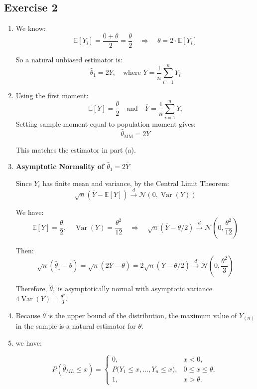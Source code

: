 \documentclass[12pt]{article}
\begin{document}
\begin{flushleft}
\section*{Exercise 2}

\begin{enumerate}[label=(\alph*)]

\item 

We know:
\[
\mathbb{E}[Y_i] = \frac{0 + \theta}{2} = \frac{\theta}{2}
\quad \Rightarrow \quad
\theta = 2 \cdot \mathbb{E}[Y_i]
\]

So a natural unbiased estimator is:
\[
\hat{\theta}_1 = 2 \overline{Y}, \quad \text{where } \overline{Y} = \frac{1}{n} \sum_{i=1}^n Y_i
\]

\item 

Using the first moment:
\[
\mathbb{E}[Y] = \frac{\theta}{2} \quad \text{and} \quad \overline{Y} = \frac{1}{n} \sum_{i=1}^n Y_i
\]
Setting sample moment equal to population moment gives:
\[
\hat{\theta}_{\text{MM}} = 2 \overline{Y}
\]

This matches the estimator in part (a).

\item \textbf{Asymptotic Normality of \( \hat{\theta}_1 = 2\overline{Y} \)}

Since \( Y_i \) has finite mean and variance, by the Central Limit Theorem:
\[
\sqrt{n}(\overline{Y} - \mathbb{E}[Y]) \xrightarrow{d} \mathcal{N}\left(0, \operatorname{Var}(Y)\right)
\]

We have:
\[
\mathbb{E}[Y] = \frac{\theta}{2}, \quad \operatorname{Var}(Y) = \frac{\theta^2}{12}
\quad \Rightarrow \quad
\sqrt{n}(\overline{Y} - \theta/2) \xrightarrow{d} \mathcal{N}\left(0, \frac{\theta^2}{12}\right)
\]

Then:
\[
\sqrt{n}(\hat{\theta}_1 - \theta) = \sqrt{n}(2\overline{Y} - \theta) = 2\sqrt{n}(\overline{Y} - \theta/2) \xrightarrow{d} \mathcal{N}\left(0, \frac{\theta^2}{3} \right)
\]

Therefore, \( \hat{\theta}_1 \) is asymptotically normal with asymptotic variance \( 4\operatorname{Var}(Y) = \frac{\theta^2}{3} \).

\item Because $\theta$ is the upper bound of the distribution, the maximum value of $Y_{(n)}$ in the sample is a natural estimator for $\theta$.

\item we have:

\[
P(\hat\theta_{ML} \le x)
= \begin{cases}
0, & x<0,\\[4pt]
\displaystyle P\big(Y_1\le x,\dots,Y_n\le x\big), & 0\le x \le \theta,\\[6pt]
1, & x>\theta.
\end{cases}
\]


\end{enumerate}
\end{flushleft}
\end{document}
